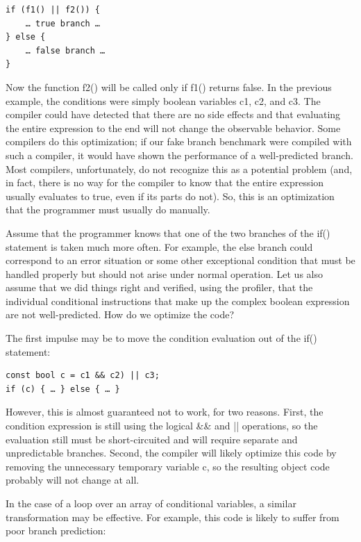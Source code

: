 \begin{lstlisting}[style=styleCXX]
if (f1() || f2()) {
	… true branch …
} else {
	… false branch …
}
\end{lstlisting}

Now the function f2() will be called only if f1() returns false. In the previous example, the conditions were simply boolean variables c1, c2, and c3. The compiler could have detected that there are no side effects and that evaluating the entire expression to the end will not change the observable behavior. Some compilers do this optimization; if our fake branch benchmark were compiled with such a compiler, it would have shown the performance of a well-predicted branch. Most compilers, unfortunately, do not recognize this as a potential problem (and, in fact, there is no way for the compiler to know that the entire expression usually evaluates to true, even if its parts do not). So, this is an optimization that the programmer must usually do manually.

Assume that the programmer knows that one of the two branches of the if() statement is taken much more often. For example, the else branch could correspond to an error situation or some other exceptional condition that must be handled properly but should not arise under normal operation. Let us also assume that we did things right and verified, using the profiler, that the individual conditional instructions that make up the complex boolean expression are not well-predicted. How do we optimize the code?

The first impulse may be to move the condition evaluation out of the if() statement:

\begin{lstlisting}[style=styleCXX]
const bool c = c1 && c2) || c3;
if (c) { … } else { … }
\end{lstlisting}

However, this is almost guaranteed not to work, for two reasons. First, the condition expression is still using the logical \&\& and || operations, so the evaluation still must be short-circuited and will require separate and unpredictable branches. Second, the compiler will likely optimize this code by removing the unnecessary temporary variable c, so the resulting object code probably will not change at all.

In the case of a loop over an array of conditional variables, a similar transformation may be effective. For example, this code is likely to suffer from poor branch prediction:

